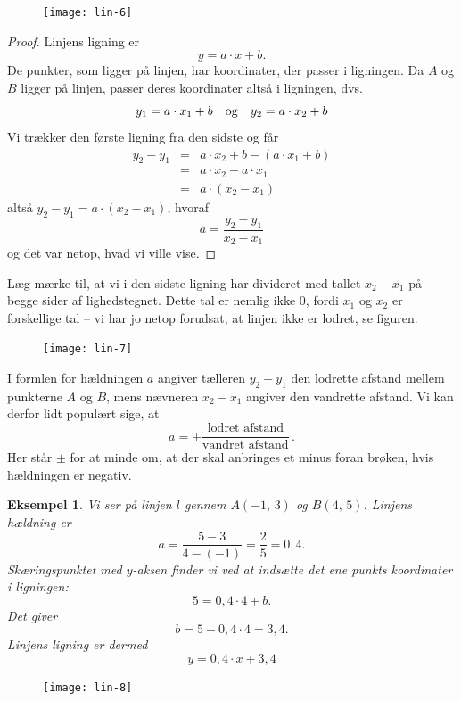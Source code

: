 \documentclass[12pt,oneside,a4paper]{article}
\newcommand{\bas}{\begin{eqnarray*}}
\newcommand{\eas}{\end{eqnarray*}}
\newtheorem{eks}[thm]{Eksempel}
\begin{document}
\begin{figure}[H]
    \centering
    \texttt{[image: lin-6]}
    \label{linear-1}
\end{figure}

\begin{proof}
    Linjens ligning er
    $$
    y = a\cdot x + b.
    $$
    De punkter, som ligger på linjen, har koordinater, der passer i
    ligningen.  Da $A$ og $B$ ligger på linjen, passer deres koordinater altså
    i ligningen, dvs.
    $$
    y_1 = a\cdot x_1 + b \quad {\rm og} \quad y_2 = a\cdot x_2 + b 
    $$
    Vi trækker den første ligning fra den sidste og får
    \bas
    y_2 - y_1 &=& a\cdot x_2 + b - (a\cdot x_1 + b) \\
              &=& a\cdot x_2 - a\cdot x_1 \\
              &=& a\cdot \left(x_2-x_1\right) 
    \eas
    altså $y_2-y_1 = a \cdot \left(x_2-x_1\right)$, hvoraf
    $$
    a = \frac{y_2-y_1}{x_2-x_1}
    $$
    og det var netop, hvad vi ville vise.
\end{proof}

Læg mærke til, at vi i den sidste ligning har divideret med tallet $x_2-x_1$ på
begge sider af lighedstegnet. Dette tal er nemlig ikke $0$, fordi $x_1$ og
$x_2$ er forskellige tal -- vi har jo netop forudsat, at linjen ikke er lodret, se
figuren.

\begin{figure}[H]
    \centering
    \texttt{[image: lin-7]}
    \label{linear-2}
\end{figure}

I formlen for hældningen $a$ angiver tælleren $y_2-y_1$ den lodrette afstand
mellem punkterne $A$ og $B$, mens nævneren $x_2-x_1$ angiver den vandrette
afstand. Vi kan derfor lidt populært sige, at
\[
a = \pm \frac{\mbox{lodret afstand}}{\mbox{vandret afstand}} \,.
\]
Her står $\pm$ for at minde om, at der skal anbringes et minus foran brøken,
hvis hældningen er negativ.
\begin{eks}
    Vi ser på linjen $l$ gennem $A(-1,\,3)$ og $B(4,\,5)$.
    Linjens hældning er
    $$
    a = \frac{5-3}{4-(-1)} = \frac{2}{5} = 0,4.
    $$
    Skæringspunktet med $y$-aksen finder vi ved at indsætte det ene punkts
    koordinater i ligningen:
    $$
    5 = 0,4\cdot 4 + b.
    $$
    Det giver
    $$
    b = 5 - 0,4\cdot 4 = 3,4.
    $$
    Linjens ligning er dermed
    $$
    y = 0,4 \cdot x + 3,4 
    $$
\end{eks}
\begin{figure}[H]
    \centering
    \texttt{[image: lin-8]}
    \label{linear-3}
\end{figure}
\end{document}
